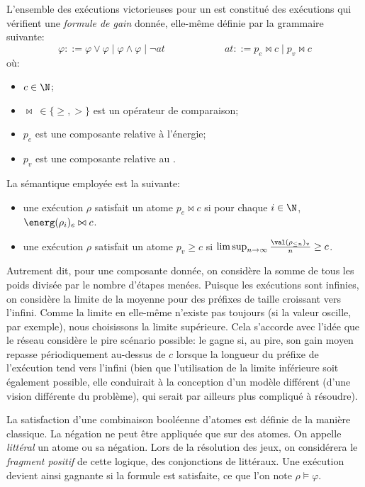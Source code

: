 L'ensemble des exécutions victorieuses pour un  est constitué des exécutions qui vérifient une \emph{formule de gain} donnée, elle-même définie par la grammaire suivante:
\[ \varphi ::= \varphi \vee \varphi \mid \varphi \wedge \varphi \mid \neg\mathit{at}
\hspace{6em}
\mathit{at} ::= p_e \bowtie c \mid p_v \bowtie c \]
où:
\begin{itemize}
    \item $c \in \N$;
    \item $\bowtie\ \in \{\geq,>\}$ est un opérateur de comparaison;
    \item $p_e$ est une composante relative à l'énergie;
    \item $p_v$ est une composante relative au .
\end{itemize}

La sémantique employée est la suivante:
\begin{itemize}
    \item une exécution $\rho$ satisfait un atome $p_e \bowtie c$ si pour chaque $i \in \N$, $\energ(\rho_i)_e \bowtie c$.
    \item une exécution $\rho$ satisfait un atome $p_v \geq c$ si $\limsup_{n \rightarrow \infty} \frac{\val(\rho_{\leq n})_v}{n} \geq c$.
\end{itemize}
Autrement dit, pour une composante donnée, on considère la somme de tous les poids divisée par le nombre d'étapes menées.
Puisque les exécutions sont infinies, on considère la limite de la moyenne pour des préfixes de taille croissant vers l'infini.
Comme la limite en elle-même n'existe pas toujours (si la valeur oscille, par exemple), nous choisissons la limite supérieure.
Cela s'accorde avec l'idée que le réseau considère le pire scénario possible: le  gagne si, au pire, son gain moyen repasse périodiquement au-dessus de $c$ lorsque la longueur du préfixe de l'exécution tend vers l'infini (bien que l'utilisation de la limite inférieure soit également possible, elle conduirait à la conception d'un modèle différent (d'une vision différente du problème), qui serait par ailleurs plus compliqué à résoudre).

La satisfaction d'une combinaison booléenne d'atomes est définie de la manière classique.
La négation ne peut être appliquée que sur des atomes.
On appelle \emph{littéral} un atome ou sa négation.
Lors de la résolution des jeux, on considérera le \emph{fragment positif} de cette logique, \cad des conjonctions de littéraux.
Une exécution devient ainsi gagnante si la formule est satisfaite, ce que l'on note $\rho\vDash\varphi$.


